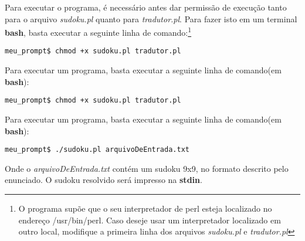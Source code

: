 \documentclass[11pt]{article}
\begin{document}
Para executar o programa, é necessário antes dar permissão de execução tanto para o arquivo \emph{sudoku.pl} quanto para \emph{tradutor.pl}. Para fazer isto em um terminal \textbf{\color{red}bash}, basta executar a seguinte linha de comando:\footnote{O programa supõe que o seu interpretador de perl esteja localizado no endereço {\color{red}/usr/bin/perl}. Caso deseje usar um interpretador localizado em outro local, modifique a primeira linha dos arquivos \emph{sudoku.pl} e \emph{tradutor.pl}}

\begin{verbatim}
meu_prompt$ chmod +x sudoku.pl tradutor.pl
\end{verbatim}

Para executar um programa, basta executar a seguinte linha de comando(em \textbf{\color{red}bash}):


\begin{verbatim}
meu_prompt$ chmod +x sudoku.pl tradutor.pl
\end{verbatim}

Para executar um programa, basta executar a seguinte linha de comando(em \textbf{\color{red}bash}):

\begin{verbatim}
meu_prompt$ ./sudoku.pl arquivoDeEntrada.txt
\end{verbatim}

Onde o \emph{arquivoDeEntrada.txt} contém um sudoku 9x9, no formato descrito pelo enunciado. O sudoku resolvido será impresso na \textbf{\color{red}stdin}.
\end{document}
